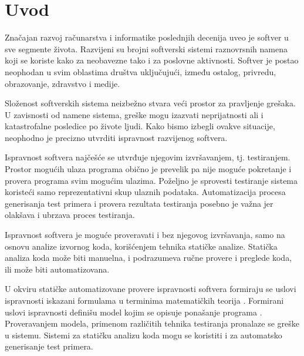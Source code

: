 \documentclass[12pt,oneside]{memoir}
\begin{document}
\frontmatter
\naslovna
\komisija
\tableofcontents*

\mainmatter

\chapter{Uvod}

Značajan razvoj računarstva i informatike poslednjih decenija uveo je softver u sve segmente života. Razvijeni su brojni softverski sistemi raznovrsnih namena koji se koriste kako za neobavezne tako i za poslovne aktivnosti. Softver je postao neophodan u svim oblastima društva uključujući, između ostalog, privredu, obrazovanje, zdravstvo i medije.

Složenost softverskih sistema neizbežno stvara veći prostor za pravljenje grešaka. U zavisnosti od namene sistema, greške mogu izazvati neprijatnosti ali i katastrofalne
posledice po živote ljudi. Kako bismo izbegli ovakve situacije, neophodno je precizno utvrditi ispravnost razvijenog softvera.

Ispravnost softvera najčešće se utvrđuje njegovim izvršavanjem, tj. testiranjem. Prostor mogućih ulaza programa obično je prevelik pa nije moguće pokretanje i provera programa svim mogućim ulazima. Poželjno je sprovesti testiranje sistema koristeći samo reprezentativni skup ulaznih podataka. Automatizacija procesa generisanja test primera i provera rezultata testiranja posebno je važna jer
olakšava i ubrzava proces testiranja.

Ispravnost softvera je moguće proveravati i bez njegovog izvršavanja, samo na osnovu analize izvornog koda, korišćenjem tehnika statičke analize. Statička analiza
koda može biti manuelna, i podrazumeva ručne provere i preglede koda, ili može biti automatizovana.

U okviru statičke automatizovane provere ispravnosti softvera formiraju se uslovi ispravnosti iskazani formulama u terminima matematičkih teorija  \cite{RigorousSD}. Formirani
uslovi ispravnosti definišu model kojim se opisuje ponašanje programa  \cite{ModelCheck}. Proveravanjem modela, primenom različitih tehnika testiranja pronalaze se greške u
sistemu. Sistemi za statičku analizu koda mogu se koristiti i za automatsko
generisanje test primera.
\end{document}

